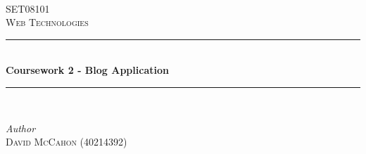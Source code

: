 \documentclass[10pt, a4paper]{article}
\title{\mytitle}
\author{\myauthor\hspace{1em}\\\contact\\Edinburgh Napier University\hspace{0.5em}-\hspace{0.5em}\mymodule}
\date{}
\begin{document}
    
\begin{titlepage} %
	\newcommand{\HRule}{\rule{\linewidth}{0.5mm}} %
	
	\center %
	
	
	\textsc{\LARGE}\\[1.5cm] %
	
	\textsc{\Large SET08101}\\[0.5cm] %
	
	\textsc{\large Web Technologies}\\[0.5cm] %
	
	
	\HRule\\[0.4cm]
	
	{\huge\bfseries Coursework 2 - Blog Application}\\[0.4cm] %
	
	\HRule\\[1.5cm]
	
	
	\begin{minipage}{0.4\textwidth}
		\begin{flushleft}
			\large
			\textit{Author}\\
			\textsc{David McCahon (40214392)} %
		\end{flushleft}
	\end{minipage}

	
	
	
	\vfill\vfill\vfill %
	

\end{titlepage}
\end{document}

